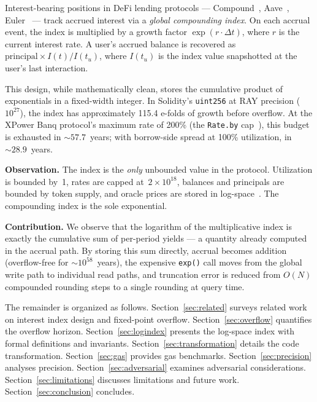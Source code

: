 \documentclass[10pt,a4paper,twocolumn]{article}
\theoremstyle{definition}
\theoremstyle{plain}
\theoremstyle{remark}
\begin{document}
Interest-bearing positions in DeFi lending protocols --- Compound~\cite{compound2019}, Aave~\cite{aave2020}, Euler~\cite{euler2022} --- track accrued interest via a \emph{global compounding index}. On each accrual event, the index is multiplied by a growth factor $\exp(r \cdot \Delta t)$, where $r$ is the current interest rate. A user's accrued balance is recovered as $\text{principal} \times I(t) / I(t_u)$, where $I(t_u)$ is the index value snapshotted at the user's last interaction.

This design, while mathematically clean, stores the cumulative product of exponentials in a fixed-width integer. In Solidity's \texttt{uint256} at RAY precision ($10^{27}$), the index has approximately 115.4 e-folds of growth before overflow. At the XPower Banq protocol's maximum rate of 200\% (the \texttt{Rate.by} cap~\cite{wp}), this budget is exhausted in ${\sim}57.7$~years; with borrow-side spread at 100\% utilization, in ${\sim}28.9$~years.

\textbf{Observation.} The index is the \emph{only} unbounded value in the protocol. Utilization is bounded by~1, rates are capped at~$2 \times 10^{18}$, balances and principals are bounded by token supply, and oracle prices are stored in log-space~\cite{wp}. The compounding index is the sole exponential.

\textbf{Contribution.} We observe that the logarithm of the multiplicative index is exactly the cumulative sum of per-period yields --- a quantity already computed in the accrual path. By storing this sum directly, accrual becomes addition (overflow-free for ${\sim}10^{58}$~years), the expensive \texttt{exp()} call moves from the global write path to individual read paths, and truncation error is reduced from $O(N)$ compounded rounding steps to a single rounding at query time.

The remainder is organized as follows. Section~\ref{sec:related} surveys related work on interest index design and fixed-point overflow. Section~\ref{sec:overflow} quantifies the overflow horizon. Section~\ref{sec:logindex} presents the log-space index with formal definitions and invariants. Section~\ref{sec:transformation} details the code transformation. Section~\ref{sec:gas} provides gas benchmarks. Section~\ref{sec:precision} analyses precision. Section~\ref{sec:adversarial} examines adversarial considerations. Section~\ref{sec:limitations} discusses limitations and future work. Section~\ref{sec:conclusion} concludes.

\end{document}
